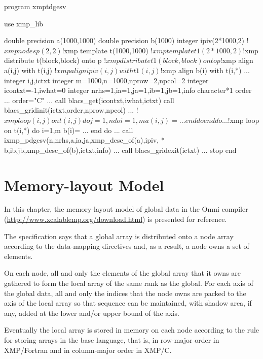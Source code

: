 \begin{description}
\begin{XFexample}
      program xmptdgesv

      use xmp_lib

      double precision a(1000,1000)
      double precision b(1000)
      integer ipiv(2*1000,2)
!$xmp nodes p(2,2)
!$xmp template t(1000,1000)
!$xmp template t1(2*1000,2)
!$xmp distribute t(block,block) onto p
!$xmp distribute t1(block,block) onto p
!$xmp align a(i,j) with t(i,j)
!$xmp align ipiv(i,j) with t1(i,j)
!$xmp align b(i) with t(i,*)
      ...
      integer i,j,ictxt
      integer m=1000,n=1000,nprow=2,npcol=2
      integer icontxt=-1,iwhat=0
      integer nrhs=1,ia=1,ja=1,ib=1,jb=1,info
      character*1 order
      ...
      order="C"
      ...
      call blacs_get(icontxt,iwhat,ictxt)
      call blacs_gridinit(ictxt,order,nprow,npcol)
      ...
!$xmp loop (i,j) on t(i,j)
      do j=1,n
         do i=1,m
            a(i,j) = ...
         end do
      end do
      ...
!$xmp loop on t(i,*)
      do i=1,m
         b(i)= ...
      end do
      ...
      call ixmp_pdgesv(n,nrhs,a,ia,ja,xmp_desc_of(a),ipiv,
     *                b,ib,jb,xmp_desc_of(b),ictxt,info)
      ...
      call blacs_gridexit(ictxt)
      ...
      stop
      end
\end{XFexample}
\end{description}


\chapter{Memory-layout Model}
\label{155445_16Jan17}

In this chapter, the memory-layout model of global data in the Omni
{\XMP} compiler (\url{http://www.xcalablemp.org/download.html}) is
presented for reference.

The {\XMP} specification says that a global array is distributed onto
a node array according to the data-mapping directives and, as a
result, a node owns a set of elements.

On each node, all and only the elements of the global array that it
owns are gathered to form the local array of the same rank as the
global. For each axis of the global data, all and only the indices 
that the node owns are packed to the axis of the local array so that
sequence can be maintained, with shadow area, if any, added at the
lower and/or upper bound of the axis.

Eventually the local array is stored in memory on each node according
to the rule for storing arrays in the base language, that is, in
row-major order in XMP/Fortran and in column-major order in XMP/C.

